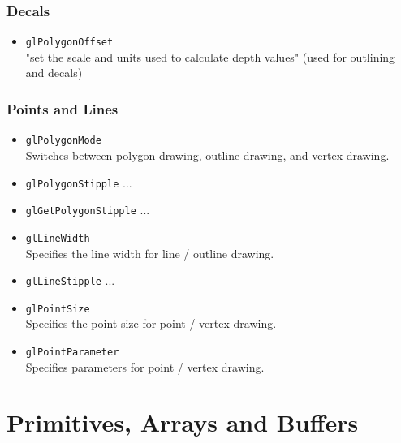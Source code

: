 \documentclass[12pt]{article}
\begin{document}
\subsubsection{Decals}
\begin{itemize}
\item \texttt{glPolygonOffset} \\
	"set the scale and units used to calculate depth values" (used for outlining and decals)
\end{itemize}

\subsubsection{Points and Lines}
\begin{itemize}
\item \texttt{glPolygonMode} \\
	Switches between polygon drawing, outline drawing, and vertex drawing.
\item \texttt{glPolygonStipple}
	...
\item \texttt{glGetPolygonStipple}
	...
\item \texttt{glLineWidth} \\
	Specifies the line width for line / outline drawing.
\item \texttt{glLineStipple}
	...
\item \texttt{glPointSize} \\
	Specifies the point size for point / vertex drawing.
\item \texttt{glPointParameter} \\
	Specifies parameters for point / vertex drawing.
\end{itemize}





\section{Primitives, Arrays and Buffers}
\end{document}
